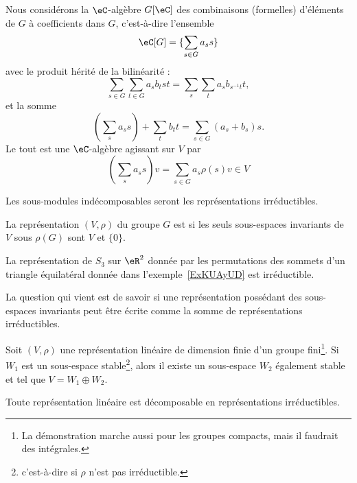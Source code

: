 Nous considérons la \( \eC\)-algèbre \( G[\eC]\) des combinaisons (formelles) d'éléments de \( G\) à coefficients dans \( G\), c'est-à-dire l'ensemble
\begin{equation}
    \eC[G]=\{ \sum_{s\in G}a_ss \}
\end{equation}
avec le produit hérité de la bilinéarité :
\begin{equation}
    \sum_{s\in G}\sum_{t\in G}a_sb_tst=\sum_s\sum_t a_sb_{s^{-1}t}t,
\end{equation}
et la somme
\begin{equation}
    (\sum_sa_ss)+\sum_tb_tt=\sum_{s\in G}(a_s+b_s)s.
\end{equation}
Le tout est une \( \eC\)-algèbre agissant sur \( V\) par
\begin{equation}
    \left( \sum_sa_ss \right)v=\sum_{s\in G}a_s\rho(s)v\in V
\end{equation}

Les sous-modules indécomposables seront les représentations irréductibles.

\begin{definition}
    La représentation \( (V,\rho)\) du groupe \( G\) est  si les seuls sous-espaces invariants de \( V\) sous \( \rho(G)\) sont $V$ et \( \{ 0 \}\).
\end{definition}

\begin{example}
    La représentation de \( S_3\) sur \( \eR^2\) donnée par les permutations des sommets d'un triangle équilatéral donnée dans l'exemple~\ref{ExKUAyUD} est irréductible.
\end{example}

La question qui vient est de savoir si une représentation possédant des sous-espaces invariants peut être écrite comme la somme de représentations irréductibles.

\begin{proposition} \label{PropHeyoAN}  
    Soit \( (V,\rho)\) une représentation linéaire de dimension finie d'un groupe fini\footnote{La démonstration marche aussi pour les groupes compacts, mais il faudrait des intégrales.}. Si \( W_1\) est un sous-espace stable\footnote{c'est-à-dire si \( \rho\) n'est pas irréductible.}, alors il existe un sous-espace \( W_2\) également stable et tel que \( V=W_1\oplus W_2\).

    Toute représentation linéaire est décomposable en représentations irréductibles.
\end{proposition}

